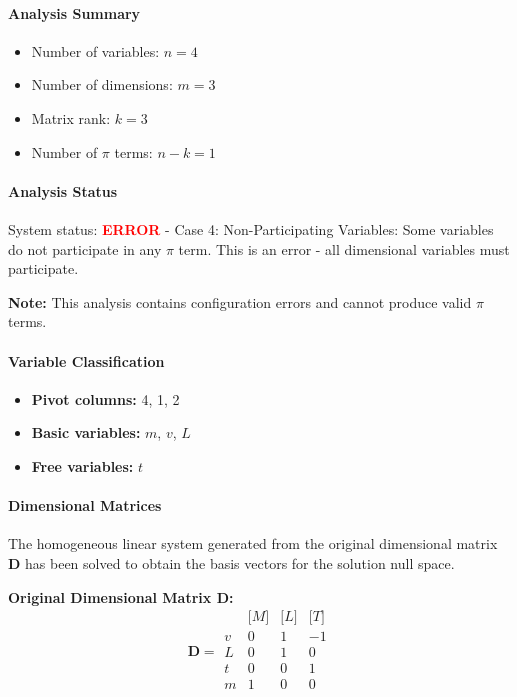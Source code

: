 \paragraph{Analysis Summary}
\begin{itemize}
\item Number of variables: $n = 4$
\item Number of dimensions: $m = 3$
\item Matrix rank: $k = 3$
\item Number of $\pi$ terms: $n - k = 1$
\end{itemize}

\paragraph{Analysis Status}
System status: \textcolor{red}{\textbf{ERROR}} - Case 4: Non-Participating Variables: Some variables do not participate in any $\pi$ term. This is an error - all dimensional variables must participate.

\textbf{Note:} This analysis contains configuration errors and cannot produce valid $\pi$ terms.


\paragraph{Variable Classification}
\begin{itemize}
\item \textbf{Pivot columns:} 4, 1, 2
\item \textbf{Basic variables:} $m$, $v$, $L$
\item \textbf{Free variables:} $t$
\end{itemize}

                \paragraph{Dimensional Matrices}
                The homogeneous linear system generated from the original dimensional matrix $\mathbf{D}$ has been solved to obtain the basis vectors for the solution null space.

                \textbf{Original Dimensional Matrix $\mathbf{D}$:}
                \[\mathbf{D} = \begin{array}{r|rrr}
                & \text{[}M\text{]} & \text{[}L\text{]} & \text{[}T\text{]} \\
                \hline
                v & 0 & 1 & -1 \\
L & 0 & 1 & 0 \\
t & 0 & 0 & 1 \\
m & 1 & 0 & 0 \\

                \end{array}\]



